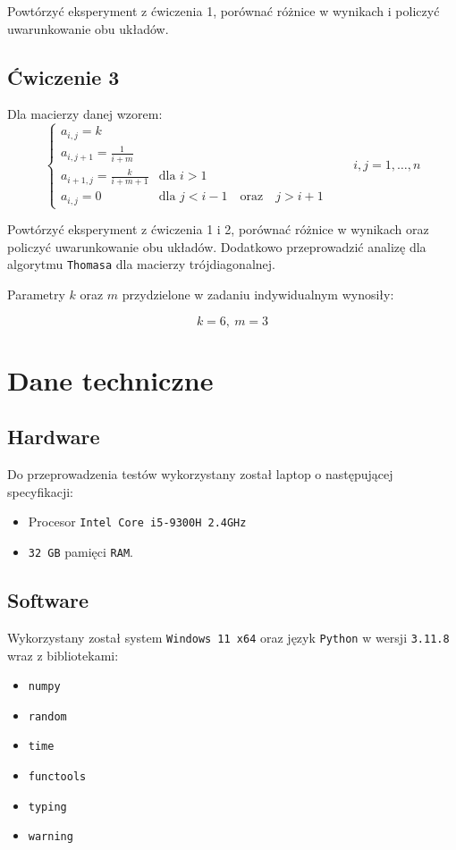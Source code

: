 \documentclass{article}
\begin{document}
\noindent
Powtórzyć eksperyment z ćwiczenia 1, porównać różnice w wynikach i policzyć uwarunkowanie obu układów.

\subsection{Ćwiczenie 3}

\noindent
Dla macierzy danej wzorem:
\[
\left\{
\begin{array}{ll}
a_{i,j} = k \\
a_{i,j+1} = \frac{1}{i + m} & \\
a_{i+1,j} = \frac{k}{i + m + 1} & \text{dla } i > 1 \\
a_{i,j} = 0 & \text{dla } j < i - 1 \quad \text{oraz} \quad j > i + 1
\end{array}
\right.
\qquad i, j = 1, \ldots, n
\]

\noindent
Powtórzyć eksperyment z ćwiczenia 1 i 2, porównać różnice w wynikach oraz policzyć uwarunkowanie obu układów. Dodatkowo przeprowadzić analizę dla algorytmu \texttt{Thomasa} dla macierzy trójdiagonalnej.

\bigbreak

\noindent
Parametry \(k\) oraz \(m\) przydzielone w zadaniu indywidualnym wynosiły:

\[k = 6, \ m = 3\]

\newpage

\section{Dane techniczne}

\subsection{Hardware}

Do przeprowadzenia testów wykorzystany został laptop o następującej specyfikacji:

\begin{itemize}
    \item Procesor \texttt{Intel Core i5-9300H 2.4GHz}
    \item \texttt{32 GB} pamięci \texttt{RAM}.
\end{itemize}

\subsection{Software}

Wykorzystany został system \texttt{Windows 11 x64} oraz język \texttt{Python} w wersji \texttt{3.11.8} wraz z bibliotekami:
\begin{itemize}
\item \texttt{numpy}
\item \texttt{random}
\item \texttt{time}
\item \texttt{functools}
\item \texttt{typing}
\item \texttt{warning}
\end{itemize}
\end{document}
